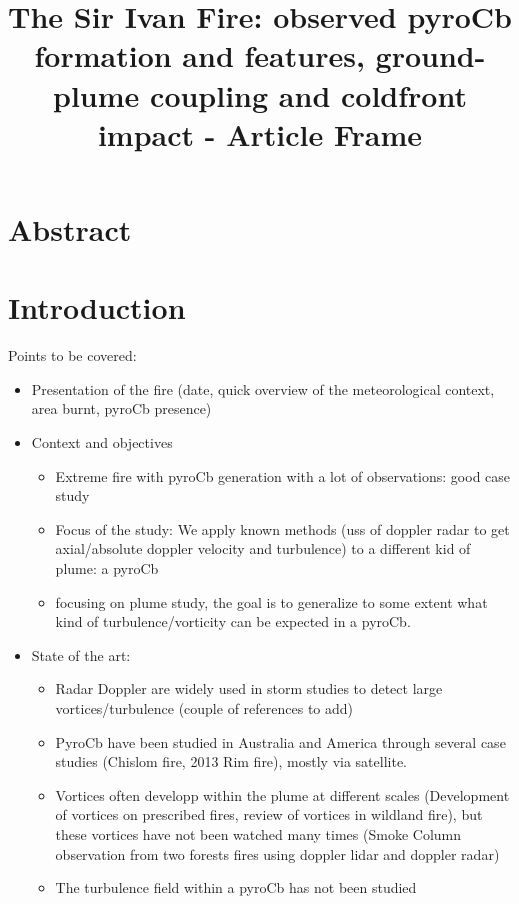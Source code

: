 \documentclass[12pt]{article}
\begin{document}
\title{The Sir Ivan Fire: observed pyroCb formation and features, ground-plume coupling and coldfront impact - Article Frame}

\maketitle


\section{Abstract}

\section{Introduction}
Points to be covered:
\begin{itemize}
\item Presentation of the fire (date, quick overview of the meteorological context, area burnt, pyroCb presence)
\item Context and objectives
\begin{itemize}
\item Extreme fire with pyroCb generation with a lot of observations: good case study
\item Focus of the study: We apply known methods (uss of doppler radar to get axial/absolute doppler velocity and turbulence) to a different kid of plume: a pyroCb
\item focusing on plume study, the goal is to generalize to some extent what kind of turbulence/vorticity can be expected in a pyroCb.
\end{itemize}

\item State of the art:

\begin{itemize}
\item Radar Doppler are widely used in storm studies to detect large vortices/turbulence (couple of references to add)
\item PyroCb have been studied in Australia and America through several case studies (Chislom fire, 2013 Rim fire), mostly via satellite.
\item Vortices often developp within the plume at different scales (Development of vortices on prescribed fires, review of vortices in wildland fire), but these vortices have not been watched many times (Smoke Column observation from two forests fires using doppler lidar and doppler radar)
\item The turbulence field within a pyroCb has not been studied
\end{itemize}

\end{itemize}
\end{document}

